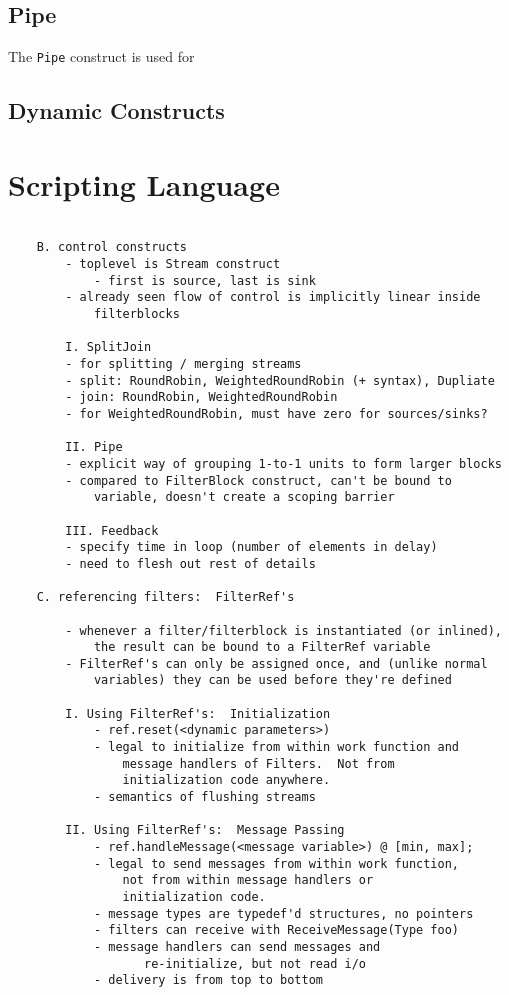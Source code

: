 \documentclass[draft]{article}
\begin{document}
\subsection{Pipe}

The {\tt Pipe} construct is used for 

\subsection{Dynamic Constructs}
\protect\label{sec:dynamic}

\section{Scripting Language}
\label{sec:script}

\begin{verbatim}

	B. control constructs
		- toplevel is Stream construct
			- first is source, last is sink
		- already seen flow of control is implicitly linear inside
			filterblocks
	
		I. SplitJoin
		- for splitting / merging streams
		- split: RoundRobin, WeightedRoundRobin (+ syntax), Dupliate
		- join: RoundRobin, WeightedRoundRobin
		- for WeightedRoundRobin, must have zero for sources/sinks?

		II. Pipe
		- explicit way of grouping 1-to-1 units to form larger blocks
		- compared to FilterBlock construct, can't be bound to 
			variable, doesn't create a scoping barrier

		III. Feedback
		- specify time in loop (number of elements in delay)
		- need to flesh out rest of details

	C. referencing filters:  FilterRef's

		- whenever a filter/filterblock is instantiated (or inlined),
			the result can be bound to a FilterRef variable
		- FilterRef's can only be assigned once, and (unlike normal
			variables) they can be used before they're defined

		I. Using FilterRef's:  Initialization
			- ref.reset(<dynamic parameters>)
			- legal to initialize from within work function and
				message handlers of Filters.  Not from 
				initialization code anywhere.
			- semantics of flushing streams

		II. Using FilterRef's:  Message Passing
			- ref.handleMessage(<message variable>) @ [min, max];
			- legal to send messages from within work function, 
				not from within message handlers or
				initialization code.
			- message types are typedef'd structures, no pointers
			- filters can receive with ReceiveMessage(Type foo)
			- message handlers can send messages and
				   re-initialize, but not read i/o
			- delivery is from top to bottom


\end{verbatim}
\end{document}
